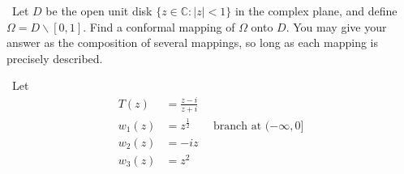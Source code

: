 \documentclass[12pt]{Qual}
\begin{document}
\begin{problem} $\,$
Let $D$ be the open unit disk $\{z\in\mathbb{C}:|z|<1\}$ in the complex plane, and define $\Omega=D\backslash[0,1].$ Find a conformal mapping of $\Omega$ onto $D.$ You may give your answer as the composition of several mappings, so long as each mapping is precisely described.
\end{problem}


\begin{solution}$\,$
Let \begin{align*}
    T(z)&=\frac{z-i}{z+i}\\
    w_1(z)&=z^{\frac{1}{2}}\qquad\text{branch at }(-\infty,0]\\
    w_2(z)&=-iz\\
    w_3(z)&=z^2
\end{align*}


\end{solution}
\end{document}
